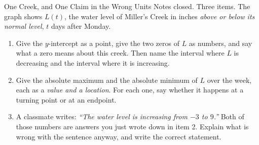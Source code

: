 \documentclass[10pt]{article}
\begin{document}

\vspace{0.15in}

\begin{notesbox}{One Creek, and One Claim in the Wrong Units}
\small
Notes closed. Three items. The graph shows $L(t)$, the water level of Miller's Creek in inches
\emph{above or below its normal level}, $t$ days after Monday.

\begin{center}
\end{center}

\begin{enumerate}[leftmargin=1.6em, itemsep=7pt, topsep=4pt]

\item Give the $y$-intercept as a point, give the two zeros of $L$ as numbers, and say what a zero
means about this creek. Then name the interval where $L$ is decreasing and the interval where it is
increasing.


\item Give the absolute maximum and the absolute minimum of $L$ over the week, each as a
\emph{value and a location}. For each one, say whether it happens at a turning point or at an
endpoint.


\item A classmate writes: \emph{``The water level is increasing from $-3$ to $9$.''} Both of those
numbers are answers you just wrote down in item 2. Explain what is wrong with the sentence anyway,
and write the correct statement.


\end{enumerate}
\end{notesbox}
\end{document}
